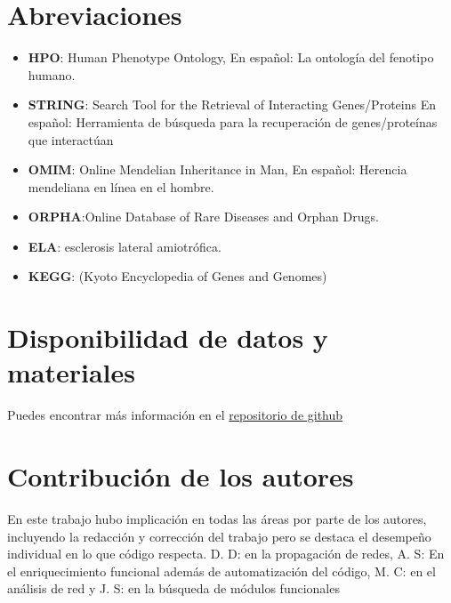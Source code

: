 \documentclass{bmcart}
\begin{document}
	\begin{backmatter}
	
		\section*{Abreviaciones}%
		\begin{itemize}
			\item \textbf{HPO}: Human Phenotype Ontology, En español: La ontología del fenotipo humano.
			\item \textbf{STRING}: Search Tool for the Retrieval of Interacting Genes/Proteins En español: Herramienta de búsqueda para la recuperación de genes/proteínas que interactúan
			\item \textbf{OMIM}: Online Mendelian Inheritance in Man, En español: Herencia mendeliana en línea en el hombre.
			\item \textbf{ORPHA}:Online Database of Rare Diseases and Orphan Drugs.
			\item \textbf{ELA}: esclerosis lateral amiotrófica.
			\item \textbf{KEGG}: (Kyoto Encyclopedia of Genes and Genomes) 
		\end{itemize}
		
		\section*{Disponibilidad de datos y materiales}%
			Puedes encontrar más información en el \href{https://github.com/Diegodepab/project_template}{repositorio de github}
			 
			
		\section*{Contribución de los autores}
			En este trabajo hubo implicación en todas las áreas por parte de los autores, incluyendo la redacción y corrección del trabajo pero se destaca el desempeño individual en lo que código respecta. D. D: en la propagación de redes, A. S: En el enriquecimiento funcional además de automatización del código, M. C: en el análisis de red y J. S: en la búsqueda de módulos funcionales
			
		
		
		
		
	\end{backmatter}
\end{document}

